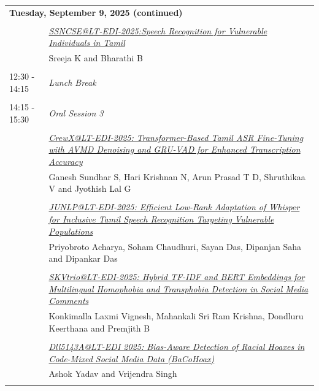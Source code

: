 \documentclass[11pt,oneside]{book}
\begin{document}
          \newpage
              \begin{tabular}{p{24mm}p{124mm}}
    \multicolumn{2}{l}{\bf Tuesday, September 9, 2025 (continued)} \\\\
          
                      & \hyperlink{page.6}{\emph{SSNCSE@LT-EDI-2025:Speech Recognition for Vulnerable Individuals in Tamil}}\\
        & Sreeja K\index{K} and Bharathi B\index{B}\\\\
                      12:30 - 14:15 & \emph{Lunch Break}\\\\
      
                      14:15 - 15:30 & \emph{Oral Session 3}\\\\
      
                
                      & \hyperlink{page.11}{\emph{CrewX@LT-EDI-2025: Transformer-Based Tamil ASR Fine-Tuning with AVMD Denoising and GRU-VAD for Enhanced Transcription Accuracy}}\\
        & Ganesh Sundhar S\index{S}, Hari Krishnan N\index{N}, Arun Prasad T D\index{D}, Shruthikaa V\index{V} and Jyothish Lal G\index{G}\\\\
                
                      & \hyperlink{page.17}{\emph{JUNLP@LT-EDI-2025: Efficient Low-Rank Adaptation of Whisper for Inclusive Tamil Speech Recognition Targeting Vulnerable Populations}}\\
        & Priyobroto Acharya\index{Acharya}, Soham Chaudhuri\index{Chaudhuri}, Sayan Das\index{Das}, Dipanjan Saha\index{Saha} and Dipankar Das\index{Das}\\\\
                
                      & \hyperlink{page.26}{\emph{SKVtrio@LT-EDI-2025: Hybrid TF-IDF and BERT Embeddings for  Multilingual Homophobia and Transphobia Detection in Social Media  Comments}}\\
        & Konkimalla Laxmi Vignesh\index{Vignesh}, Mahankali Sri Ram Krishna\index{Krishna}, Dondluru Keerthana\index{Keerthana} and Premjith B\index{B}\\\\
                
                      & \hyperlink{page.31}{\emph{Dll5143A@LT-EDI 2025: Bias-Aware Detection of Racial Hoaxes in Code-Mixed Social Media Data (BaCoHoax)}}\\
        & Ashok Yadav\index{Yadav} and Vrijendra Singh\index{Singh}\\\\
                

\end{tabular}
\end{document}
